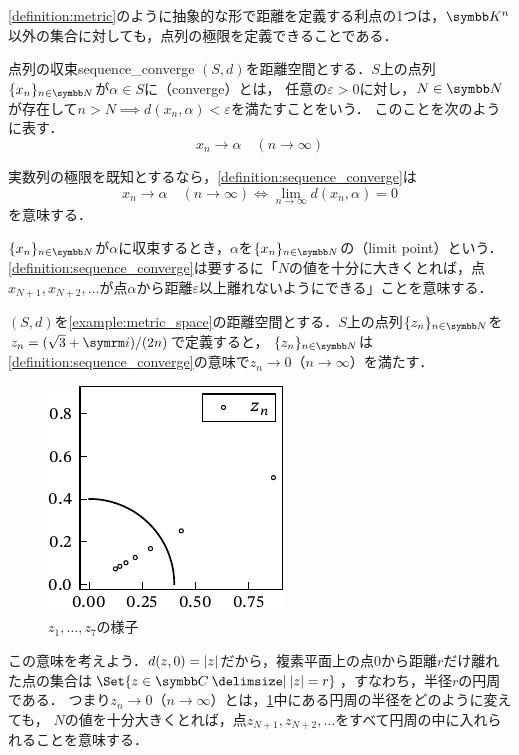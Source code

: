\documentclass[../../main]{subfiles}
\begin{document}
\cref{definition:metric}のように抽象的な形で距離を定義する利点の1つは，\(\numset{K}^n\)以外の集合に対しても，点列の極限を定義できることである．

\begin{definition}{点列の収束}{sequence_converge}
  \((S,d)\)を距離空間とする．\(S\)上の点列\(\seq{x_n}_{n\in\numset{N}}\)が\(\alpha\in S\)に（converge）とは，
  任意の\(\varepsilon>0\)に対し，\(N\in\numset{N}\)が存在して\(n>N\implies d(x_n,\alpha)<\varepsilon\)を満たすことをいう．
  このことを次のように表す．
  \[
    x_n\to\alpha\quad(n\to\infty)
  \]
\end{definition}

\begin{note}
  実数列の極限を既知とするなら，\cref{definition:sequence_converge}は
  \[
    x_n \to \alpha\quad(n\to\infty)
    \iff\lim_{n\to\infty}d(x_n,\alpha) = 0
  \]
  を意味する．
\end{note}

\(\seq{x_n}_{n\in\numset{N}}\)が\(\alpha\)に収束するとき，\(\alpha\)を\(\seq{x_n}_{n\in\numset{N}}\)の（limit point）という．
\cref{definition:sequence_converge}は要するに「\(N\)の値を十分に大きくとれば，点\(x_{N+1},x_{N+2},\dotsc\)が点\(\alpha\)から距離\(\varepsilon\)以上離れないようにできる」ことを意味する．

\begin{example}
  \label{example:complex_planes_convergence}
  \((S,d)\)を\cref{example:metric_space}の距離空間とする．\(S\)上の点列\(\seq{z_n}_{n\in\numset{N}}\)を\(z_n=(\sqrt{3}+\iuni)/(2n)\)で定義すると，
  \(\seq{z_n}_{n\in\numset{N}}\)は\cref{definition:sequence_converge}の意味で\(z_n\to 0\)（\(n\to\infty\)）を満たす．

  \begin{figure}[htbp]
    \centering
    \includegraphics{complex_convergence.pdf}
    \caption{\(z_1,\dots,z_7\)の様子}
    \label{figure:sequence_converge}
  \end{figure}

  この意味を考えよう．\(d(z,0)=\lvert z\rvert\)だから，複素平面上の点\(0\)から距離\(r\)だけ離れた点の集合は\(\Set{z\in\numset{C}\given\abs{z}=r}\)，すなわち，半径\(r\)の円周である．
  つまり\(z_n\to 0\)（\(n\to\infty\)）とは，\cref{figure:sequence_converge}中にある円周の半径をどのように変えても，
  \(N\)の値を十分大きくとれば，点\(z_{N+1},z_{N+2},\dotsc\)をすべて円周の中に入れられることを意味する．
\end{example}
\end{document}
